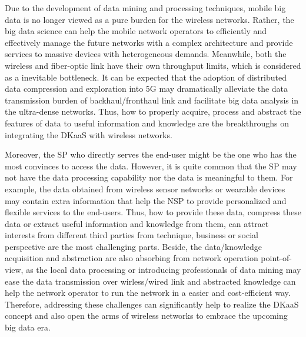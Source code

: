 \documentclass[12pt,draftclsnofoot,onecolumn]{IEEEtran}
\begin{document}
Due to the development of data mining and processing techniques,
mobile big data is no longer viewed as a pure burden for the
wireless networks. Rather, the big data science can help the
mobile network operators to efficiently and effectively manage the
future networks with a complex architecture and provide services
to massive devices with heterogeneous demands. Meanwhile, both the
wireless and fiber-optic link have their own throughput limits,
which is considered as a inevitable bottleneck. It can be expected
that the adoption of distributed data compression and exploration
into 5G may dramatically alleviate the data transmission burden of
backhaul/fronthaul link and facilitate big data analysis in the
ultra-dense networks. Thus, how to properly acquire, process and
abstract the features of data to useful information and knowledge
are the breakthroughs on integrating the DKaaS with wireless
networks.\par

Moreover, the SP who directly serves the end-user might be the one who has
the most convinces to access the data. However, it is quite common
that the SP may not have the data processing capability nor the
data is meaningful to them. For example, the data obtained from
wireless sensor networks or wearable devices may contain extra
information that help the NSP to provide personalized and
flexible services to the end-users. Thus, how to provide these
data, compress these data or extract useful information and
knowledge from them, can attract interests from different third parties
from technique, business or social perspective are the most
challenging parts. Beside, the data/knowledge acquisition and
abstraction are also absorbing from network operation
point-of-view, as the local data processing or introducing
professionals of data mining may ease the data transmission over
wirless/wired link and abstracted knowledge can help the network
operator to run the network in a easier and cost-efficient way.
Therefore, addressing these challenges can significantly help to
realize the DKaaS concept and also open the arms of wireless
networks to embrace the upcoming big data era.
\end{document}
